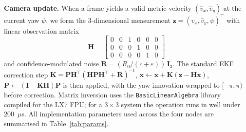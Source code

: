 \documentclass[conference]{IEEEtran}
\begin{document}
\textbf{Camera update.}  When a frame yields a valid metric velocity
$(\hat{v}_x, \hat{v}_y)$ at the current yaw $\psi$, we form the
3-dimensional measurement
$\mathbf{z} = (\hat{v}_x, \hat{v}_y, \psi)^\top$ with linear
observation matrix
\begin{equation}
\mathbf{H} =
\begin{bmatrix}
0 & 0 & 1 & 0 & 0 & 0 \\
0 & 0 & 0 & 1 & 0 & 0 \\
0 & 0 & 0 & 0 & 1 & 0
\end{bmatrix}
\end{equation}
and confidence-modulated noise
$\mathbf{R} = (R_0 / (c + \varepsilon))\,\mathbf{I}_3$.  The standard
EKF correction step
$\mathbf{K} = \mathbf{P}\mathbf{H}^\top(\mathbf{H}\mathbf{P}\mathbf{H}^\top + \mathbf{R})^{-1}$,
$\mathbf{x} \leftarrow \mathbf{x} + \mathbf{K}(\mathbf{z} - \mathbf{H}\mathbf{x})$,
$\mathbf{P} \leftarrow (\mathbf{I} - \mathbf{K}\mathbf{H})\mathbf{P}$
is then applied, with the yaw innovation wrapped to
$[-\pi, \pi)$ before correction.  Matrix inversion uses the
\texttt{BasicLinearAlgebra} library compiled for the LX7 FPU; for a
$3\times 3$ system the operation runs in well under 200~$\mu$s. All
implementation parameters used across the four nodes are summarised
in Table~\ref{tab:params}.
\end{document}
